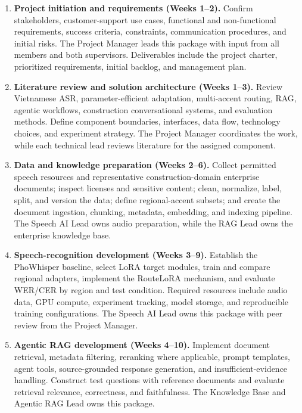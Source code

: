 \documentclass[11pt,a4paper]{article}
\begin{document}
\begin{enumerate}
  \item \textbf{Project initiation and requirements (Weeks 1--2).}
  Confirm stakeholders, customer-support use cases, functional and
  non-functional requirements, success criteria, constraints, communication
  procedures, and initial risks. The Project Manager leads this package with
  input from all members and both supervisors. Deliverables include the project
  charter, prioritized requirements, initial backlog, and management plan.

  \item \textbf{Literature review and solution architecture (Weeks 1--3).}
  Review Vietnamese ASR, parameter-efficient adaptation, multi-accent routing,
  RAG, agentic workflows, construction conversational systems, and evaluation
  methods. Define component boundaries, interfaces, data flow, technology
  choices, and experiment strategy. The Project Manager coordinates the work,
  while each technical lead reviews literature for the assigned component.

  \item \textbf{Data and knowledge preparation (Weeks 2--6).}
  Collect permitted speech resources and representative construction-domain
  enterprise documents; inspect licenses and sensitive content; clean,
  normalize, label, split, and version the data; define regional-accent subsets;
  and create the document ingestion, chunking, metadata, embedding, and indexing
  pipeline. The Speech AI Lead owns audio preparation, while the RAG Lead owns
  the enterprise knowledge base.

  \item \textbf{Speech-recognition development (Weeks 3--9).}
  Establish the PhoWhisper baseline, select LoRA target modules, train and
  compare regional adapters, implement the RouteLoRA mechanism, and evaluate
  WER/CER by region and test condition. Required resources include audio data,
  GPU compute, experiment tracking, model storage, and reproducible training
  configurations. The Speech AI Lead owns this package with peer review from
  the Project Manager.

  \item \textbf{Agentic RAG development (Weeks 4--10).}
  Implement document retrieval, metadata filtering, reranking where applicable,
  prompt templates, agent tools, source-grounded response generation, and
  insufficient-evidence handling. Construct test questions with reference
  documents and evaluate retrieval relevance, correctness, and faithfulness.
  The Knowledge Base and Agentic RAG Lead owns this package.


\end{enumerate}
\end{document}
